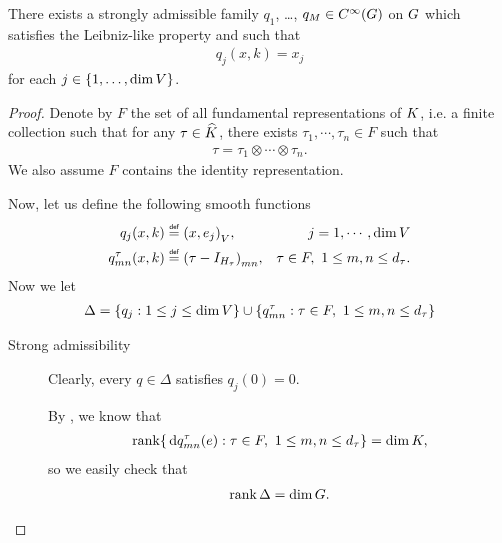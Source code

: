 \begin{lemma}
\label{lemma:choice_of_polynomials}
    There exists a strongly admissible family $q_1$, \dots, $q_M \in {C^\infty(G)}$ on $G$ which satisfies the Leibniz-like property and such that
    \begin{align*}
        q_j(x, k) = x_j
    \end{align*}
    for each $j \in \{1, \dots, \dim V\}$.
\end{lemma}
\begin{proof}
    Denote by $F$ the set of all fundamental representations of $K$,
    i.e. a finite collection such that for any $\tau \in {\widehat{K}}$,
    there exists $\tau_1, \cdots, \tau_n \in F$ such that
    \begin{align*}
        \tau = \tau_1 \otimes \cdots \otimes \tau_n.
    \end{align*}
    We also assume $F$ contains the identity representation.

    Now,
    let us define the following smooth functions
    \begin{align*}
        q_j(x, k) &\defeq \ip {x} {e_j}, &j = 1, \cdots, \dim \VectorSpace\\
        q^\tau_{m n}(x, k) &\defeq {\left(\tau - \Id {H_\tau}\right)}_{m n},
        &\tau \in F, \ 1 \leq m, n \leq \dimRep \tau.
    \end{align*}
    Now we let
    \begin{align*}
        \Delta = \{q_j : 1 \leq j \leq \dim V\}
        \cup \{q^\tau_{m n} : \tau \in F, \ 1 \leq m, n \leq {d_{\tau}}\}
    \end{align*}

    \begin{description}
        \item [Strong admissibility]
            Clearly, every $q \in \Delta$ satisfies $q_j(0) = 0$.

            By \cite[Lemma 5.11]{Fischer2015},
            we know that
            \begin{align*}
                \operatorname{rank} \{\,\mathrm{d} q^\tau_{m n}(e) : \tau \in F, \ 1 \leq m, n \leq {d_{\tau}}\} = \dim K,
            \end{align*}
            so we easily check that
            \begin{align*}
                \operatorname{rank} \Delta = \dim G.
            \end{align*}


\end{description}
\end{proof}
